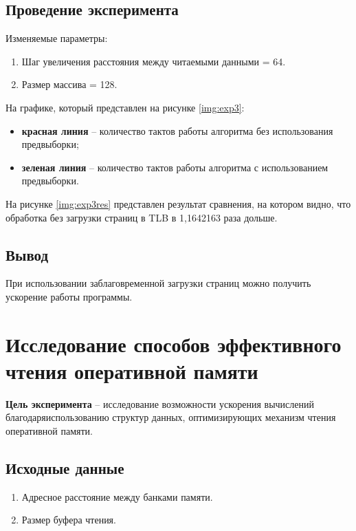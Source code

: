 \subsection{Проведение эксперимента}

Изменяемые параметры:
\begin{enumerate}
	\item Шаг увеличения расстояния между читаемыми данными = 64.
	\item Размер массива = 128.
\end{enumerate}

На графике, который представлен на рисунке \ref{img:exp3}:
\begin{itemize}
    \item \textbf{красная линия} -- количество тактов работы алгоритма без
          использования предвыборки;
    \item \textbf{зеленая линия} -- количество тактов работы алгоритма с
          использованием предвыборки.
\end{itemize}



На рисунке \ref{img:exp3res} представлен результат сравнения, на котором видно,
что обработка без загрузки страниц в TLB в 1,1642163 раза дольше.

\subsection{Вывод}

При использовании заблаговременной загрузки страниц можно получить ускорение
работы программы.




\section{Исследование способов эффективного  чтения оперативной памяти}

\textbf{Цель эксперимента} -- исследование возможности ускорения вычислений благодаряиспользованию структур данных, оптимизирующих механизм чтения оперативной памяти.

\subsection{Исходные данные}
\begin{enumerate}
	\item Адресное расстояние между банками памяти.
	\item Размер буфера чтения.
\end{enumerate}

